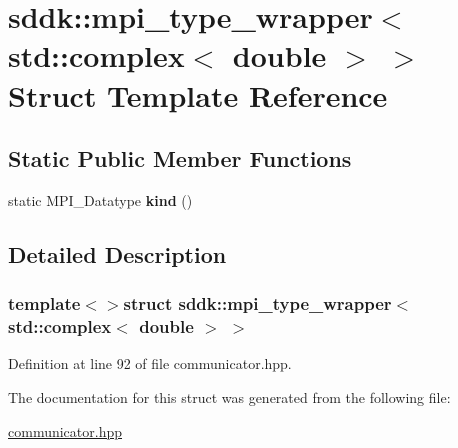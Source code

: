 \hypertarget{structsddk_1_1mpi__type__wrapper_3_01std_1_1complex_3_01double_01_4_01_4}{}\section{sddk\+:\+:mpi\+\_\+type\+\_\+wrapper$<$ std\+:\+:complex$<$ double $>$ $>$ Struct Template Reference}
\label{structsddk_1_1mpi__type__wrapper_3_01std_1_1complex_3_01double_01_4_01_4}
\subsection*{Static Public Member Functions}
\begin{DoxyCompactItemize}
\item 
\hypertarget{structsddk_1_1mpi__type__wrapper_3_01std_1_1complex_3_01double_01_4_01_4_acd3156506f8f5b9c3293b87a421f892e}{}static M\+P\+I\+\_\+\+Datatype {\bfseries kind} ()\label{structsddk_1_1mpi__type__wrapper_3_01std_1_1complex_3_01double_01_4_01_4_acd3156506f8f5b9c3293b87a421f892e}

\end{DoxyCompactItemize}


\subsection{Detailed Description}
\subsubsection*{template$<$$>$struct sddk\+::mpi\+\_\+type\+\_\+wrapper$<$ std\+::complex$<$ double $>$ $>$}



Definition at line 92 of file communicator.\+hpp.



The documentation for this struct was generated from the following file\+:\begin{DoxyCompactItemize}
\item 
\hyperlink{communicator_8hpp}{communicator.\+hpp}\end{DoxyCompactItemize}
